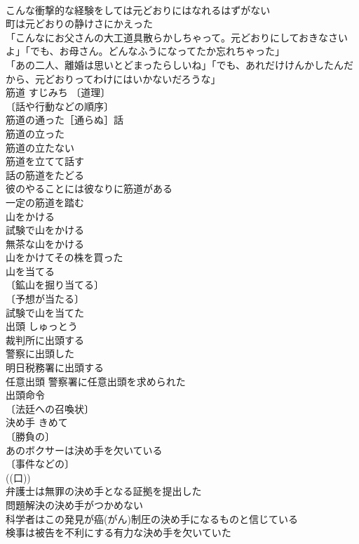 \documentclass[8pt]{extreport}
\begin{document}
\begin{CJK}{UTF8}{min}
\\	こんな衝撃的な経験をしては元どおりにはなれるはずがない 
\\	町は元どおりの静けさにかえった 
\\	「こんなにお父さんの大工道具散らかしちゃって。元どおりにしておきなさいよ」「でも、お母さん。どんなふうになってたか忘れちゃった」 
\\	「あの二人、離婚は思いとどまったらしいね」「でも、あれだけけんかしたんだから、元どおりってわけにはいかないだろうな」 
\\	筋道	すじみち	〔道理〕
\\	〔話や行動などの順序〕
\\	筋道の通った［通らぬ］話 
\\	筋道の立った 
\\	筋道の立たない 
\\	筋道を立てて話す 
\\	話の筋道をたどる 
\\	彼のやることには彼なりに筋道がある 
\\	一定の筋道を踏む 
\\	山をかける		
\\	試験で山をかける 
\\	無茶な山をかける 
\\	山をかけてその株を買った 
\\	山を当てる		
\\	〔鉱山を掘り当てる〕
\\	〔予想が当たる〕
\\	試験で山を当てた 
\\	出頭	しゅっとう	
\\	裁判所に出頭する 
\\	警察に出頭した 
\\	明日税務署に出頭する 
\\	任意出頭 警察署に任意出頭を求められた 
\\	出頭命令 
\\	〔法廷への召喚状〕
\\	決め手	きめて	
\\	〔勝負の〕
\\	あのボクサーは決め手を欠いている 
\\	〔事件などの〕
\\	((口)) 
\\	弁護士は無罪の決め手となる証拠を提出した 
\\	問題解決の決め手がつかめない 
\\	科学者はこの発見が癌(がん)制圧の決め手になるものと信じている 
\\	検事は被告を不利にする有力な決め手を欠いていた 

\end{CJK}
\end{document}
